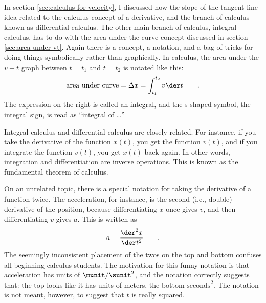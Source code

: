 In section \ref{sec:calculus-for-velocity}, I discussed how the slope-of-the-tangent-line
idea related to the calculus concept of a derivative, and
the branch of calculus known as differential calculus. The
other main branch of calculus, integral
calculus, has to do with the area-under-the-curve concept
discussed in section \ref{sec:area-under-vt}. Again there is a
concept, a notation, and a bag of tricks for doing things
symbolically rather than graphically. In calculus, the area
under the $v-t$ graph between $t=t_1$ and $t=t_2$ is notated like this:
\begin{equation*}
  \text{area under curve} = \Delta x = \int_{t_1}^{t_2}v \der t \qquad .
\end{equation*}
The expression on the right is called an integral, and the
s-shaped symbol, the integral sign, is read as ``integral of \ldots''

Integral calculus and differential calculus are closely
related. For instance, if you take the derivative of the
function $x(t)$, you get the function $v(t)$, and if you
integrate the function $v(t)$, you get $x(t)$ back again. In
other words, integration and differentiation are inverse
operations. This is known as the fundamental theorem of
calculus.

On an unrelated topic, there is a special notation for
taking the derivative of a function twice. The acceleration,
for instance, is the second (i.e., double) derivative
of the position, because differentiating $x$ once gives $v$,
and then differentiating $v$ gives $a$. This is written as
\begin{equation*}
   a = \frac{\der^2 x}{\der t^2}    \qquad   .
\end{equation*}
The seemingly inconsistent placement of the twos on the top
and bottom confuses all beginning calculus students. The
motivation for this funny notation is that acceleration has
units of $\munit/\sunit^2$, and the notation correctly suggests that:
the top looks like it has units of meters, the bottom
$\text{seconds}^2$. The notation is not meant, however, to suggest
that $t$ is really squared.

